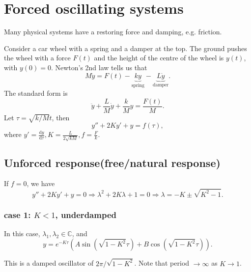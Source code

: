\documentclass[10pt]{article}
\begin{document}
    \section{Forced oscillating systems}
    Many physical systems have a restoring force and damping, e.g. friction.
    \begin{example}
        Consider a car wheel with a spring and a damper at the top. The ground pushes the wheel with a force $ F(t) $ and the height of the centre of the wheel is $y(t)$, with $y(0)=0$. Newton's 2nd law tells us that 
        \begin{equation}\label{eq:14.2}
            M\ddot{y} = F(t)-\underbrace{ky}_{\text{spring}}-\underbrace{L \dot{y}}_{\text{damper}}.
        \end{equation}
        The standard form is 
        \[
            \ddot{y}+\frac{L}{M}\dot{y}+\frac{k}{M}y=\frac{F(t)}{M}
        .\]
        Let $ \tau= \sqrt{k/M}t $, then 
        \[
            y''+2Ky'+y=f(\tau)
        ,\]
        where $ y'=\frac{\mathrm{d}y}{\mathrm{d}\tau}, K=\frac{L}{2\sqrt{kM}}, f=\frac{F}{k}  $.
    \end{example}
    \subsection{Unforced response(free/natural response)}
    If $f=0$, we have 
    \[
        y''+2Ky'+y=0 \Longrightarrow \lambda^2+2K \lambda+1=0 \Longrightarrow \lambda = -K\pm \sqrt{K^2-1}
    .\]
    \subsubsection*{case 1: $ K<1 $, underdamped}
    In this case, $ \lambda_1,\lambda_2\in \mathbb{C} $, and 
    \[
        y=e^{-K\tau}\left( A \sin \left( \sqrt{1-K^2}\tau \right)+B \cos \left( \sqrt{1-K^2}\tau \right) \right)
    .\]
    \begin{center}
      \end{center}
      This is a damped oscillator of $2\pi/\sqrt{1-K^2}$. Note that period $ \to \infty $ as $ K \to 1 $.
\end{document}
